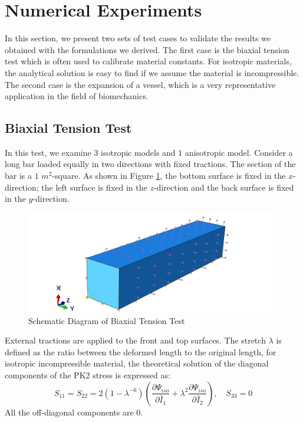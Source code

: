 \section{Numerical Experiments}
In this section, we present two sets of test cases to validate the results we obtained with the formulations we derived. The first case is the biaxial tension test which is often used to calibrate material constants. For isotropic materials, the analytical solution is easy to find if we assume the material is incompressible. The second case is the expansion of a vessel, which is a very representative application in the field of biomechanics.  

\subsection{Biaxial Tension Test}
\label{biaxial_tension_test}
In this test, we examine $3$ isotropic models and $1$ anisotropic model. Consider a long bar loaded equally in two directions with fixed tractions. The section of the bar is a $1$ $m^2$-square. As shown in Figure \ref{fig:biaxial_schematic}, the bottom surface is fixed in the $x$-direction; the left surface is fixed in the $z$-direction and the back surface is fixed in the $y$-direction. 

\begin{figure}[H]
\centering
\includegraphics[width=.8\textwidth]{./figures/biaxial_schematic2.png}
\caption{Schematic Diagram of Biaxial Tension Test}
\label{fig:biaxial_schematic}
\end{figure}


External tractions are applied to the front and top surfaces. The stretch $\lambda$ is defined as the ratio between the deformed length to the original length, for isotropic incompressible material, the theoretical solution of the diagonal components of the PK2 stress is expressed as:
\begin{equation} \label{biaxialPK2}
S_{11} = S_{22} = 2(1 - {\lambda}^{-6})(\frac{\partial\Psi_{iso}}{\partial\bar{I}_1} + {\lambda}^2\frac{\partial\Psi_{iso}}{\partial\bar{I}_2}), \quad S_{33} = 0
\end{equation}
All the off-diagonal components are $0$.

